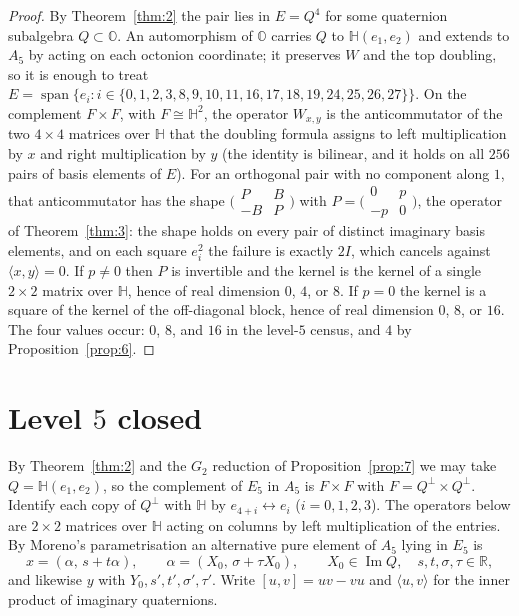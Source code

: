 \documentclass{baustms}
\theoremstyle{cupthm}
\numberwithin{equation}{section}
\newcommand{\HH}{\mathbb{H}}
\newcommand{\OO}{\mathbb{O}}
\newcommand{\RR}{\mathbb{R}}
\newcommand{\Imm}{\operatorname{Im}}
\begin{document}
\begin{proof}
By Theorem~\ref{thm:2} the pair lies in $E=Q^4$ for some quaternion subalgebra $Q\subset\OO$. An automorphism of $\OO$ carries $Q$ to $\HH(e_1,e_2)$ and extends to $A_5$ by acting on each octonion coordinate; it preserves $W$ and the top doubling, so it is enough to treat $E=\operatorname{span}\{e_i:i\in\{0,1,2,3,8,9,10,11,16,17,18,19,24,25,26,27\}\}$. On the complement $F\times F$, with $F\cong\HH^2$, the operator $W_{x,y}$ is the anticommutator of the two $4\times 4$ matrices over $\HH$ that the doubling formula assigns to left multiplication by $x$ and right multiplication by $y$ (the identity is bilinear, and it holds on all $256$ pairs of basis elements of $E$). For an orthogonal pair with no component along $1$, that anticommutator has the shape $\bigl(\begin{smallmatrix}P&B\\ -B&P\end{smallmatrix}\bigr)$ with $P=\bigl(\begin{smallmatrix}0&p\\ -p&0\end{smallmatrix}\bigr)$, the operator of Theorem~\ref{thm:3}: the shape holds on every pair of distinct imaginary basis elements, and on each square $e_i^2$ the failure is exactly $2I$, which cancels against $\langle x,y\rangle=0$. If $p\neq 0$ then $P$ is invertible and the kernel is the kernel of a single $2\times 2$ matrix over $\HH$, hence of real dimension $0$, $4$, or $8$. If $p=0$ the kernel is a square of the kernel of the off-diagonal block, hence of real dimension $0$, $8$, or $16$. The four values occur: $0$, $8$, and $16$ in the level-$5$ census, and $4$ by Proposition~\ref{prop:6}.
\end{proof}

\section{Level $5$ closed}

By Theorem~\ref{thm:2} and the $G_2$ reduction of Proposition~\ref{prop:7} we may take $Q=\HH(e_1,e_2)$, so the complement of $E_5$ in $A_5$ is $F\times F$ with $F=Q^\perp\times Q^\perp$. Identify each copy of $Q^\perp$ with $\HH$ by $e_{4+i}\leftrightarrow e_i$ ($i=0,1,2,3$). The operators below are $2\times 2$ matrices over $\HH$ acting on columns by left multiplication of the entries. By Moreno's parametrisation an alternative pure element of $A_5$ lying in $E_5$ is
\begin{equation}
x=(\alpha,\, s+t\alpha),\qquad \alpha=(X_0,\,\sigma+\tau X_0),\qquad X_0\in\Imm Q,\quad s,t,\sigma,\tau\in\RR,
\label{eq:nf}
\end{equation}
and likewise $y$ with $Y_0,s',t',\sigma',\tau'$. Write $[u,v]=uv-vu$ and $\langle u,v\rangle$ for the inner product of imaginary quaternions.
\end{document}
